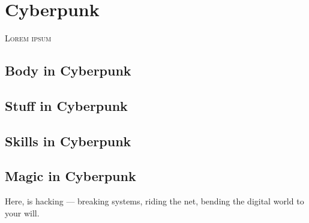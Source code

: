 \renewcommand{\realmaccent}{realmCyber}  %
\chapter{Cyberpunk}

\begin{readaloud}
\lipsum[34][1-4]
\end{readaloud}


\lettrine{L}{orem ipsum} \lipsum[35]

\section{Body in Cyberpunk}
\lipsum[36][1-4]

\section{Stuff in Cyberpunk}
\lipsum[37][1-4]

\section{Skills in Cyberpunk}
\lipsum[38][1-4]

\section{Magic in Cyberpunk}
Here,  is hacking --- breaking systems, riding the net,
bending the digital world to your will. \lipsum[39][1-3]

\begin{notebox}
\lipsum[40][1-3]
\end{notebox}
